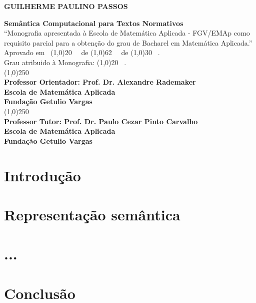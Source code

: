 \documentclass[12pt, a4paper, twoside]{article}
\theoremstyle{definition}
\newcommand{\supervisor}{Alexandre Rademaker}
\begin{document}
\begin{titlepage}
 \begin{center}
 
  {\bf \large \uppercase{Guilherme Paulino Passos}}\\[0.3cm]

  \vspace{25 mm}

  {\bf \large Semântica Computacional para Textos Normativos}\\[3cm]

  {“Monografia apresentada à Escola de Matemática Aplicada  - FGV/EMAp como requisito parcial para a obtenção do grau de Bacharel em Matemática Aplicada.”}\\[3cm]


  {Aprovado em \ \line(1,0){20} \ \ de \line(1,0){62} \ \ de \line(1,0){30} \ .}\\[0.1cm]
  {Grau atribuido à Monografia: \line(1,0){20} \ . }\\[3cm]
  
  
  {\line(1,0){250}}\\
  {\bf Professor Orientador: Prof. Dr. \supervisor}\\[0.1cm]
  {\bf Escola de Matemática Aplicada}\\[0.1cm]
  {\bf Fundação Getulio Vargas}\\[1.5cm]
  
    {\line(1,0){250}}\\
    {\bf Professor Tutor: Prof. Dr. Paulo Cezar Pinto Carvalho}\\[0.1cm]
    {\bf Escola de Matemática Aplicada}\\[0.1cm]
    {\bf Fundação Getulio Vargas}
 \end{center}
\end{titlepage}

\newpage\null\thispagestyle{empty}\newpage


\tableofcontents

\newpage

\section{Introdução}
\newpage
\section{Representação semântica}
\label{sec:rep}


\newpage
\section{...}

\newpage
\section{Conclusão}


\newpage


\end{document}
